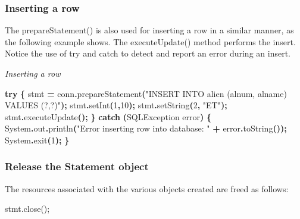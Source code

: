 \documentclass[
]{article}
\newenvironment{Shaded}{\begin{snugshade}}{\end{snugshade}}
\newcommand{\BuiltInTok}[1]{#1}
\newcommand{\ControlFlowTok}[1]{\textcolor[rgb]{0.13,0.29,0.53}{\textbf{#1}}}
\newcommand{\DecValTok}[1]{\textcolor[rgb]{0.00,0.00,0.81}{#1}}
\newcommand{\FunctionTok}[1]{\textcolor[rgb]{0.00,0.00,0.00}{#1}}
\newcommand{\NormalTok}[1]{#1}
\newcommand{\OperatorTok}[1]{\textcolor[rgb]{0.81,0.36,0.00}{\textbf{#1}}}
\newcommand{\StringTok}[1]{\textcolor[rgb]{0.31,0.60,0.02}{#1}}
\begin{document}
\hypertarget{inserting-a-row}{%
\subsubsection*{Inserting a row}\label{inserting-a-row}}

The prepareStatement() is also used for inserting a row in a similar
manner, as the following example shows. The executeUpdate() method
performs the insert. Notice the use of try and catch to detect and
report an error during an insert.

\emph{Inserting a row}

\begin{Shaded}
\begin{Highlighting}[]
\ControlFlowTok{try} \OperatorTok{\{}
\NormalTok{    stmt }\OperatorTok{=}\NormalTok{ conn}\OperatorTok{.}\FunctionTok{prepareStatement}\OperatorTok{(}\StringTok{"INSERT INTO alien (alnum, alname) VALUES (?,?)"}\OperatorTok{);}
\NormalTok{    stmt}\OperatorTok{.}\FunctionTok{setInt}\OperatorTok{(}\DecValTok{1}\OperatorTok{,}\DecValTok{10}\OperatorTok{);}
\NormalTok{    stmt}\OperatorTok{.}\FunctionTok{setString}\OperatorTok{(}\DecValTok{2}\OperatorTok{,} \StringTok{"ET"}\OperatorTok{);}
\NormalTok{    stmt}\OperatorTok{.}\FunctionTok{executeUpdate}\OperatorTok{();}
    \OperatorTok{\}}
\ControlFlowTok{catch} \OperatorTok{(}\BuiltInTok{SQLException}\NormalTok{ error}\OperatorTok{)}
\OperatorTok{\{}
    \BuiltInTok{System}\OperatorTok{.}\FunctionTok{out}\OperatorTok{.}\FunctionTok{println}\OperatorTok{(}\StringTok{"Error inserting row into database: "}
     \OperatorTok{+}\NormalTok{ error}\OperatorTok{.}\FunctionTok{toString}\OperatorTok{());}
    \BuiltInTok{System}\OperatorTok{.}\FunctionTok{exit}\OperatorTok{(}\DecValTok{1}\OperatorTok{);}
\OperatorTok{\}}
\end{Highlighting}
\end{Shaded}

\hypertarget{release-the-statement-object}{%
\subsubsection*{Release the Statement object}\label{release-the-statement-object}}

The resources associated with the various objects created are freed as
follows:

stmt.close();
\end{document}
